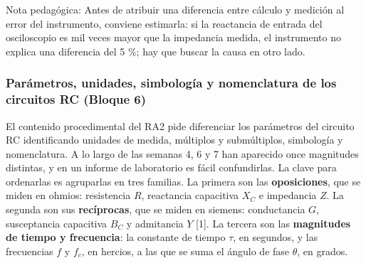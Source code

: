 \documentclass[11pt,letterpaper]{article}
\begin{document}
\begin{nota}{Nota pedagógica:}
Antes de atribuir una diferencia entre cálculo y medición al \guillemotleft{}error del instrumento\guillemotright{}, conviene estimarla: si la reactancia de entrada del osciloscopio es mil veces mayor que la impedancia medida, el instrumento no explica una diferencia del 5 \%; hay que buscar la causa en otro lado.
\end{nota}

\subsubsection{Parámetros, unidades, simbología y nomenclatura de los circuitos RC (Bloque 6)}

El contenido procedimental del RA2 pide diferenciar los parámetros del circuito RC identificando unidades de medida, múltiplos y submúltiplos, simbología y nomenclatura. A lo largo de las semanas 4, 6 y 7 han aparecido once magnitudes distintas, y en un informe de laboratorio es fácil confundirlas. La clave para ordenarlas es agruparlas en tres familias. La primera son las \textbf{oposiciones}, que se miden en ohmios: resistencia $R$, reactancia capacitiva $X_C$ e impedancia $Z$. La segunda son sus \textbf{recíprocas}, que se miden en siemens: conductancia $G$, susceptancia capacitiva $B_C$ y admitancia $Y$ [1]. La tercera son las \textbf{magnitudes de tiempo y frecuencia}: la constante de tiempo $\tau$, en segundos, y las frecuencias $f$ y $f_c$, en hercios, a las que se suma el ángulo de fase $\theta$, en grados.
\end{document}

